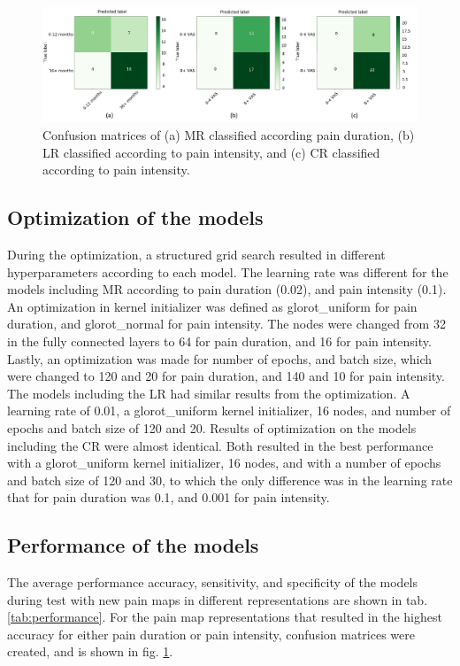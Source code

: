 \begin{figure} [b!]
\begin{tcolorbox}[colframe=black!30!black, colback=white]
    \includegraphics[width=1\textwidth]{Figures/samcon}
  \caption{Confusion matrices of (a) MR classified according pain duration, (b) LR classified according to pain intensity, and (c) CR classified according to pain intensity.}
  \label{fig:confma}
\end{tcolorbox}
\end{figure}

\subsection*{Optimization of the models}
During the optimization, a structured grid search resulted in different hyperparameters according to each model. The learning rate was different for the models including MR according to pain duration (0.02), and pain intensity (0.1). An optimization in kernel initializer was defined as glorot\_uniform for pain duration, and glorot\_normal for pain intensity. The nodes were changed from 32 in the fully connected layers to 64 for pain duration, and 16 for pain intensity. Lastly, an optimization was made for number of epochs, and batch size, which were changed to 120 and 20 for pain duration, and 140 and 10 for pain intensity. The models including the LR had similar results from the optimization. A learning rate of 0.01, a glorot\_uniform kernel initializer, 16 nodes, and number of epochs and batch size of 120 and 20. 
Results of optimization on the models including the CR were almost identical. Both resulted in the best performance with a glorot\_uniform kernel initializer, 16 nodes, and with a number of epochs and batch size of 120 and 30, to which the only difference was in the learning rate that for pain duration was 0.1, and 0.001 for pain intensity.

\subsection*{Performance of the models}
The average performance accuracy, sensitivity, and specificity of the models during test with new pain maps in different representations are shown in tab. \ref{tab:performance}. \newline
For the pain map representations that resulted in the highest accuracy for either pain duration or pain intensity, confusion matrices were created, and is shown in fig. \ref{fig:confma}.